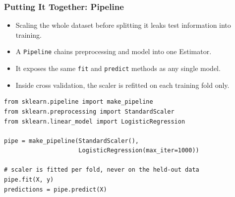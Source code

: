 \begin{frame}[fragile]\frametitle{Putting It Together: Pipeline}

	\begin{itemize}
	\item Scaling the whole dataset before splitting it leaks test information into training.
	\item A \texttt{Pipeline} chains preprocessing and model into one Estimator.
	\item It exposes the same \texttt{fit} and \texttt{predict} methods as any single model.
	\item Inside cross validation, the scaler is refitted on each training fold only.
	\end{itemize}

\begin{lstlisting}
from sklearn.pipeline import make_pipeline
from sklearn.preprocessing import StandardScaler
from sklearn.linear_model import LogisticRegression

pipe = make_pipeline(StandardScaler(),
                     LogisticRegression(max_iter=1000))

# scaler is fitted per fold, never on the held-out data
pipe.fit(X, y)
predictions = pipe.predict(X)
\end{lstlisting}
\end{frame}








